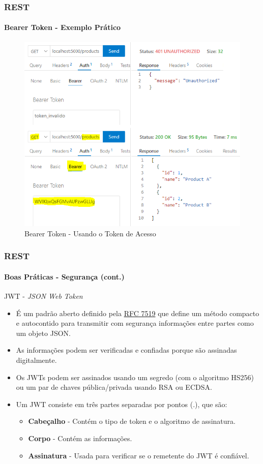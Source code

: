 \documentclass[
	9pt, %
	t, %
]{beamer}
\begin{document}
\begin{frame}
	\frametitle{REST}
	\framesubtitle{Bearer Token - Exemplo Prático}

	\begin{figure}
		\includegraphics[width=0.7\linewidth]{bearer_products.png}
		\caption{Bearer Token - Usando o Token de Acesso}
		\label{fig:bearer_token_usando}
	\end{figure}
		
\end{frame}


\begin{frame}
	\frametitle{REST}
	\framesubtitle{Boas Práticas - Segurança (cont.)}

	\begin{block}{JWT - \textit{JSON Web Token}}
		\begin{itemize}
			\item É um padrão aberto definido pela \href{https://datatracker.ietf.org/doc/html/rfc7519}{RFC 7519} que define um método compacto e autocontido para transmitir com segurança informações entre partes como um objeto JSON.
			\item As informações podem ser verificadas e confiadas porque são assinadas digitalmente.
			\item Os JWTs podem ser assinados usando um segredo (com o algoritmo HS256) ou um par de chaves pública/privada usando RSA ou ECDSA.
			\item Um JWT consiste em três partes separadas por pontos (.), que são:
			\begin{itemize}
				\item \textbf{Cabeçalho} - Contém o tipo de token e o algoritmo de assinatura.
				\item \textbf{Corpo} - Contém as informações.
				\item \textbf{Assinatura} - Usada para verificar se o remetente do JWT é confiável.
			\end{itemize}
		\end{itemize}
	\end{block}

\end{frame}
\end{document}
